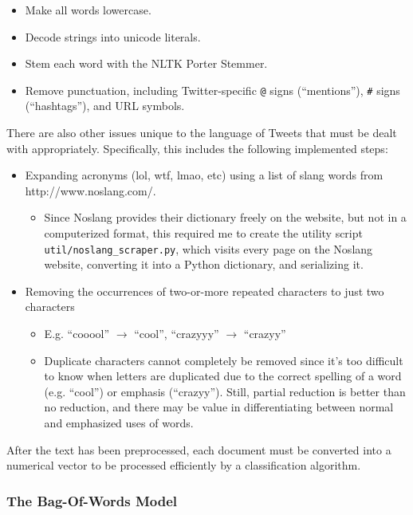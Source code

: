 \documentclass[letter,12pt]{article}
\begin{document}
\begin{itemize}
  \item Make all words lowercase.
  \item Decode strings into unicode literals.
  \item Stem each word with the NLTK Porter Stemmer.
  \item Remove punctuation, including Twitter-specific \texttt{@} signs
    (``mentions''), \texttt{\#} signs (``hashtags''), and URL symbols.
\end{itemize}

There are also other issues unique to the language of Tweets that must
be dealt with appropriately. Specifically, this includes the following
implemented steps:

\begin{itemize}
  \item Expanding acronyms (lol, wtf, lmao, etc) using a list of slang words
    from http://www.noslang.com/.
    \begin{itemize}
      \item Since Noslang provides their dictionary freely on the website, but
        not in a computerized format, this required me to create the utility script
        \texttt{util/noslang\_scraper.py}, which visits every page on the
        Noslang website, converting it into a Python dictionary, and
        serializing it.
    \end{itemize}
  \item Removing the occurrences of two-or-more repeated characters to just
    two characters
    \begin{itemize}
      \item E.g. ``cooool'' $\rightarrow$ ``cool'', ``crazyyy'' $\rightarrow$
        ``crazyy''
      \item Duplicate characters cannot completely be removed since it's too
        difficult to know when letters are duplicated due to the correct
        spelling of a word (e.g. ``cool'') or emphasis (``crazyy''). Still,
        partial reduction is better than no reduction, and there may be value
        in differentiating between normal and emphasized uses of words.
    \end{itemize}
\end{itemize}

After the text has been preprocessed, each document must be converted into a
numerical vector to be processed efficiently by a classification algorithm.

\subsubsection{The Bag-Of-Words Model}
\label{ssub:the_bag_of_words_model}
\end{document}
